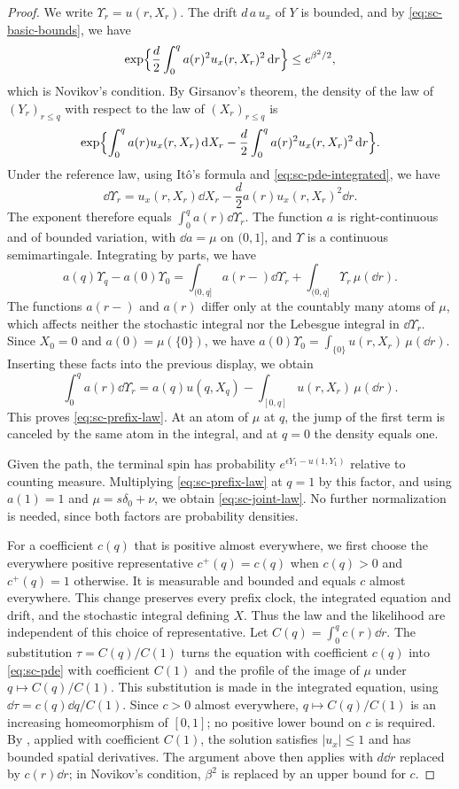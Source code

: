 \begin{proof}
We write $\Upsilon_r=u(r,X_r)$. The drift $d\,a\,u_x$ of $Y$ is
bounded, and by \eqref{eq:sc-basic-bounds}, we have
\[
 \exp\Bigl\{\frac d2\int_0^qa(r)^2u_x(r,X_r)^2\,\mathrm d r\Bigr\}\le e^{\beta^2/2},
\]
which is Novikov's condition. By Girsanov's theorem, the density of the law of $(Y_r)_{r\le q}$ with
respect to the law of $(X_r)_{r\le q}$ is
\[
 \exp\Bigl\{\int_0^qa(r)u_x(r,X_r)\,\mathrm d X_r
 -\frac d2\int_0^qa(r)^2u_x(r,X_r)^2\,\mathrm d r\Bigr\}.
\]
Under the reference law, using Itô's formula and
\eqref{eq:sc-pde-integrated}, we have
\[
 \dd\Upsilon_r=u_x(r,X_r)\dd X_r-\frac d2a(r)u_x(r,X_r)^2\dd r .
\]
The exponent therefore equals $\int_0^qa(r)\dd\Upsilon_r$. The function $a$ is
right-continuous and of bounded variation, with $\dd a=\mu$ on
$(0,1]$, and $\Upsilon$ is a continuous semimartingale. Integrating by
parts, we have
\[
 a(q)\Upsilon_q-a(0)\Upsilon_0
 =\int_{(0,q]}a(r-)\dd\Upsilon_r+\int_{(0,q]}\Upsilon_r\,\mu(\dd r).
\]
The functions $a(r-)$ and $a(r)$ differ only at the countably many
atoms of $\mu$, which affects neither the stochastic integral nor the
Lebesgue integral in $\dd\Upsilon_r$. Since $X_0=0$ and
$a(0)=\mu(\{0\})$, we have
$a(0)\Upsilon_0=\int_{\{0\}}u(r,X_r)\,\mu(\dd r)$. Inserting these facts
into the previous display, we obtain
\[
 \int_0^qa(r)\dd\Upsilon_r=a(q)u(q,X_q)-\int_{[0,q]}u(r,X_r)\,\mu(\dd r).
\]
This proves \eqref{eq:sc-prefix-law}. At an atom of $\mu$ at $q$, the
jump of the first term is canceled by the same atom in the integral,
and at $q=0$ the density equals one.

Given the path, the terminal spin has probability
$e^{\epsilon Y_1-u(1,Y_1)}$ relative to counting measure. Multiplying
\eqref{eq:sc-prefix-law} at $q=1$ by this factor, and using $a(1)=1$
and $\mu=s\delta_0+\nu$, we obtain \eqref{eq:sc-joint-law}. No further
normalization is needed, since both factors are probability densities.

For a coefficient $c(q)$ that is positive almost everywhere, we first
choose the everywhere positive representative
$c^+(q)=c(q)$ when $c(q)>0$ and $c^+(q)=1$ otherwise. It is measurable
and bounded and equals $c$ almost everywhere. This change preserves
every prefix clock, the integrated equation and drift, and the
stochastic integral defining $X$. Thus the law and the likelihood
are independent of this choice of representative.
Let $C(q)=\int_0^qc(r)\dd r$. The substitution
$\tau=C(q)/C(1)$ turns the equation with coefficient $c(q)$ into
\eqref{eq:sc-pde} with coefficient $C(1)$ and the profile of the image
of $\mu$ under $q\mapsto C(q)/C(1)$. This substitution is made in the
integrated equation, using $\dd\tau=c(q)\dd q/C(1)$. Since $c>0$ almost
everywhere, $q\mapsto C(q)/C(1)$ is an increasing homeomorphism of
$[0,1]$; no positive lower bound on $c$ is required. By
\cite[Proposition~2.1]{Lopatto}, applied with coefficient $C(1)$, the
solution satisfies $|u_x|\le1$ and has bounded spatial
derivatives. The argument above then applies with $d\dd r$ replaced by
$c(r)\dd r$; in Novikov's condition, $\beta^2$ is replaced by an
upper bound for $c$.
\end{proof}

